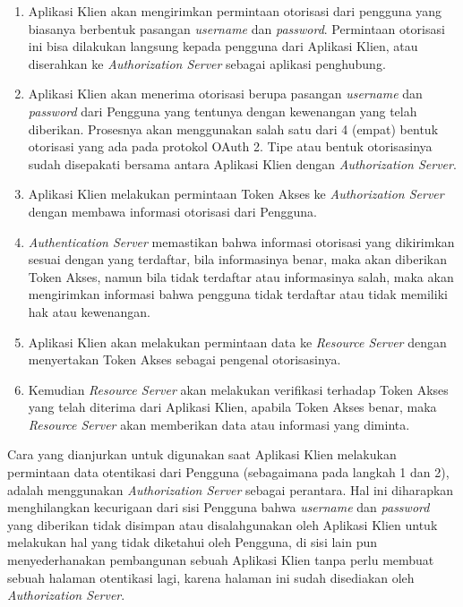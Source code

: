 \documentclass[pdftex,12pt, oneside]{article}
\begin{document}
\begin{enumerate}
	
	\item Aplikasi Klien akan mengirimkan permintaan otorisasi dari pengguna yang biasanya berbentuk pasangan \textit{username} dan \textit{password}. Permintaan otorisasi ini bisa dilakukan langsung kepada pengguna dari Aplikasi Klien, atau diserahkan ke \textit{Authorization Server} sebagai aplikasi penghubung.

	\item Aplikasi Klien akan menerima otorisasi berupa pasangan \textit{username} dan \textit{password} dari Pengguna yang tentunya dengan kewenangan yang telah diberikan. Prosesnya akan menggunakan salah satu dari 4 (empat) bentuk otorisasi yang ada pada protokol OAuth 2. Tipe atau bentuk otorisasinya sudah disepakati bersama antara Aplikasi Klien dengan \textit{Authorization Server}.

	\item Aplikasi Klien melakukan permintaan Token Akses ke \textit{Authorization Server} dengan membawa informasi otorisasi dari Pengguna.
	
	\item \textit{Authentication Server} memastikan bahwa informasi otorisasi yang dikirimkan sesuai dengan yang terdaftar, bila informasinya benar, maka akan diberikan Token Akses, namun bila tidak terdaftar atau informasinya salah, maka akan mengirimkan informasi bahwa pengguna tidak terdaftar atau tidak memiliki hak atau kewenangan.
	
	\item Aplikasi Klien akan melakukan permintaan data ke \textit{Resource Server} dengan menyertakan Token Akses sebagai pengenal otorisasinya.
	
	\item Kemudian \textit{Resource Server} akan melakukan verifikasi terhadap Token Akses yang telah diterima dari Aplikasi Klien, apabila Token Akses benar, maka \textit{Resource Server} akan memberikan data atau informasi yang diminta.
	
\end{enumerate}

Cara yang dianjurkan untuk digunakan saat Aplikasi Klien melakukan permintaan data otentikasi dari Pengguna (sebagaimana pada langkah 1 dan 2), adalah menggunakan \textit{Authorization Server} sebagai perantara. Hal ini diharapkan menghilangkan kecurigaan dari sisi Pengguna bahwa \textit{username} dan \textit{password} yang diberikan tidak disimpan atau disalahgunakan oleh Aplikasi Klien untuk melakukan hal yang tidak diketahui oleh Pengguna, di sisi lain pun menyederhanakan pembangunan sebuah Aplikasi Klien tanpa perlu membuat sebuah halaman otentikasi lagi, karena halaman ini sudah disediakan oleh \textit{Authorization Server}.
\end{document}
